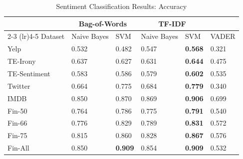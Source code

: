 \begin{table}
\caption{Sentiment Classification Results: Accuracy}
\label{tab:sentiment_acc}
\begin{tabularx}{\linewidth}{lXXXXX}
\toprule
 & \multicolumn{2}{c}{Bag-of-Words} & \multicolumn{2}{c}{TF-IDF} & \\
\cmidrule(lr){2-3} \cmidrule(lr){4-5}
Dataset & Naive Bayes & SVM & Naive Bayes & SVM & VADER \\
\midrule
Yelp & 0.532 & 0.482 & 0.547 & \textbf{0.568} & 0.321 \\
TE-Irony & 0.637 & 0.627 & 0.631 & \textbf{0.644} & 0.475 \\
TE-Sentiment & 0.583 & 0.586 & 0.579 & \textbf{0.602} & 0.535 \\
Twitter & 0.664 & 0.775 & 0.684 & \textbf{0.779} & 0.340 \\
IMDB & 0.850 & 0.870 & 0.869 & \textbf{0.906} & 0.699 \\
Fin-50 & 0.764 & 0.786 & 0.775 & \textbf{0.791} & 0.540 \\
Fin-66 & 0.776 & 0.829 & 0.789 & \textbf{0.831} & 0.572 \\
Fin-75 & 0.815 & 0.860 & 0.828 & \textbf{0.867} & 0.576 \\
Fin-All & 0.850 & \textbf{0.909} & 0.854 & \textbf{0.909} & 0.532 \\
\bottomrule
\end{tabularx}
\end{table}